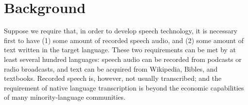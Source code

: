 \section{Background}

Suppose we require that, in
order to develop speech technology, it is necessary first to have (1)
some amount of recorded speech audio, and (2) some amount of text
written in the target language.  These two requirements can be met by
at least several hundred languages: speech audio can be recorded
from podcasts or radio broadcasts,
and text can be acquired from Wikipedia, Bibles, and textbooks.
Recorded speech is, however, not usually transcribed; and the
requirement of native language transcription is beyond the economic
capabilities of many minority-language communities.

